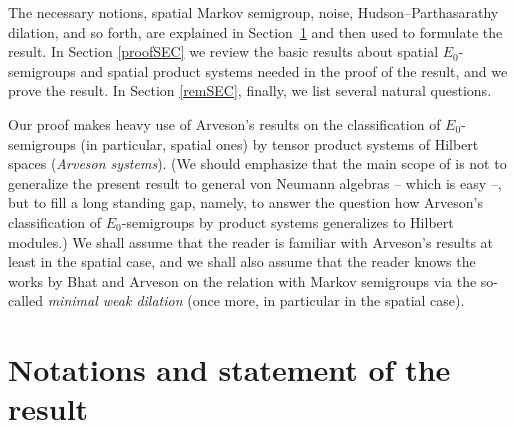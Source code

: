 \documentclass[pdftex]{sigma}%
\numberwithin{equation}{section}
\begin{document}
The necessary notions, spatial Markov semigroup, noise, Hudson--Parthasarathy dilation, and so forth, are explained in Section~\ref{notSEC} and then used to formulate the result. In Section \ref{proofSEC} we review the basic results about spatial $E_0$-semigroups and spatial product systems needed in the proof of the result, and we prove the result. In Section \ref{remSEC}, finally, we list several natural questions.

Our proof makes heavy use of Arveson's results \cite{Arv89} on the classification of $E_0$-semi\-groups (in particular, spatial ones) by tensor product systems of Hilbert spaces ({\it Arveson systems}). (We should emphasize that the main scope of \cite{Ske16} is not to generalize the present result to general von Neumann algebras -- which is easy --, but to fill a long standing gap, namely, to answer the question how Arveson's classification of $E_0$-semigroups by product systems generalizes to Hilbert modules.) We shall assume that the reader is familiar with Arveson's results at least in the spatial case, and we shall also assume that the reader knows the works by Bhat \cite{Bha96} and Arveson \cite{Arv97a} on the relation with Markov semigroups via the so-called {\it minimal weak dilation} (once more, in particular in the spatial case).

\section{Notations and statement of the result}\label{notSEC}
\end{document}
